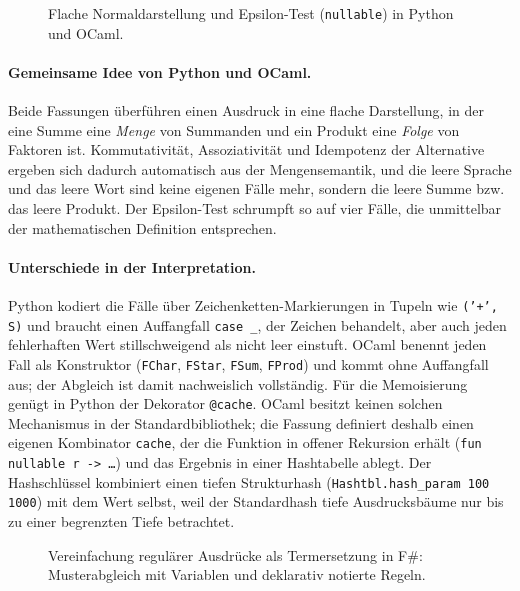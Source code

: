 \begin{figure}[tbp]


\caption{Flache Normaldarstellung und Epsilon-Test (\texttt{nullable}) in Python und OCaml.}
\label{fig:simplify_nullable}
\end{figure}

\paragraph{Gemeinsame Idee von Python und OCaml.}
Beide Fassungen überführen einen Ausdruck in eine flache Darstellung, in der eine Summe eine \emph{Menge} von Summanden und ein Produkt eine \emph{Folge} von Faktoren ist.
Kommutativität, Assoziativität und Idempotenz der Alternative ergeben sich dadurch automatisch aus der Mengensemantik, und die leere Sprache und das leere Wort sind keine eigenen Fälle mehr, sondern die leere Summe bzw. das leere Produkt.
Der Epsilon-Test schrumpft so auf vier Fälle, die unmittelbar der mathematischen Definition entsprechen.

\paragraph{Unterschiede in der Interpretation.}
Python kodiert die Fälle über Zeichenketten-Markierungen in Tupeln wie \texttt{('+', S)} und braucht einen Auffangfall \texttt{case \_}, der Zeichen behandelt, aber auch jeden fehlerhaften Wert stillschweigend als nicht leer einstuft.
OCaml benennt jeden Fall als Konstruktor (\texttt{FChar}, \texttt{FStar}, \texttt{FSum}, \texttt{FProd}) und kommt ohne Auffangfall aus; der Abgleich ist damit nachweislich vollständig.
Für die Memoisierung genügt in Python der Dekorator \texttt{@cache}.
OCaml besitzt keinen solchen Mechanismus in der Standardbibliothek; die Fassung definiert deshalb einen eigenen Kombinator \texttt{cache}, der die Funktion in offener Rekursion erhält (\texttt{fun nullable r -> \dots}) und das Ergebnis in einer Hashtabelle ablegt.
Der Hashschlüssel kombiniert einen tiefen Strukturhash (\texttt{Hashtbl.hash\_param 100 1000}) mit dem Wert selbst, weil der Standardhash tiefe Ausdrucksbäume nur bis zu einer begrenzten Tiefe betrachtet.

\begin{figure}[tbp]

\caption{Vereinfachung regulärer Ausdrücke als Termersetzung in F\#: Musterabgleich mit Variablen und deklarativ notierte Regeln.}
\label{fig:simplify_rewrite}
\end{figure}


